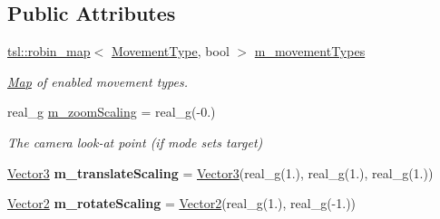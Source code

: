 \subsection*{Public Attributes}
\begin{DoxyCompactItemize}
\item 
\mbox{\label{structrev_1_1_camera_controller_1_1_controller_profile_a048ca07925328c3fe82ad5e5156f08f5}} 
\mbox{\hyperlink{classtsl_1_1robin__map}{tsl\+::robin\+\_\+map}}$<$ \mbox{\hyperlink{classrev_1_1_camera_controller_aa9e6df05f604325e6844cc37f5ec711c}{Movement\+Type}}, bool $>$ \mbox{\hyperlink{structrev_1_1_camera_controller_1_1_controller_profile_a048ca07925328c3fe82ad5e5156f08f5}{m\+\_\+movement\+Types}}
\begin{DoxyCompactList}\small\item\em \mbox{\hyperlink{classrev_1_1_map}{Map}} of enabled movement types. \end{DoxyCompactList}\item 
\mbox{\label{structrev_1_1_camera_controller_1_1_controller_profile_a8bb030b00f80993f85cb527bcea02a9c}} 
real\+\_\+g \mbox{\hyperlink{structrev_1_1_camera_controller_1_1_controller_profile_a8bb030b00f80993f85cb527bcea02a9c}{m\+\_\+zoom\+Scaling}} = real\+\_\+g(-\/0.)
\begin{DoxyCompactList}\small\item\em The camera look-\/at point (if mode sets target) \end{DoxyCompactList}\item 
\mbox{\label{structrev_1_1_camera_controller_1_1_controller_profile_a4a399477a3a8949411a27a86250db764}} 
\mbox{\hyperlink{classrev_1_1_vector}{Vector3}} {\bfseries m\+\_\+translate\+Scaling} = \mbox{\hyperlink{classrev_1_1_vector}{Vector3}}(real\+\_\+g(1.), real\+\_\+g(1.), real\+\_\+g(1.))
\item 
\mbox{\label{structrev_1_1_camera_controller_1_1_controller_profile_a9a5a35c61bcd8afaeda09982dab3eb7f}} 
\mbox{\hyperlink{classrev_1_1_vector}{Vector2}} {\bfseries m\+\_\+rotate\+Scaling} = \mbox{\hyperlink{classrev_1_1_vector}{Vector2}}(real\+\_\+g(1.), real\+\_\+g(-\/1.))
\item 

\end{DoxyCompactItemize}
